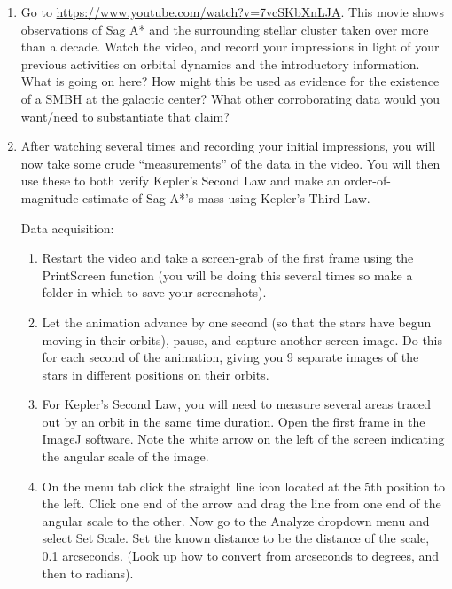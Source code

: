 \begin{enumerate}
	\item Go to \url{https://www.youtube.com/watch?v=7vcSKbXnLJA}. This movie shows observations of Sag
	A* and the surrounding stellar cluster taken over more than a decade. Watch the video, and record
	your impressions in light of your previous activities on orbital dynamics and the introductory
	information. What is going on here? How might this be used as evidence for the existence
	of a SMBH at the galactic center? What other corroborating data would you want/need to
	substantiate that claim?
	
	\item After watching several times and recording your initial impressions, you will now take some crude “measurements” of the data in the video. You will then use these to both verify Kepler’s Second Law and make an order-of-magnitude estimate of Sag A*’s mass using Kepler’s Third Law.
	
	Data acquisition:
	\begin{enumerate}
		\item Restart the video and take a screen-grab of the first frame using the PrintScreen function (you will
		be doing this several times so make a folder in which to save your screenshots).
		
		\item Let the animation advance by one second (so that the stars have begun moving in their
		orbits), pause, and capture another screen image. Do this for each second of the animation,
		giving you 9 separate images of the stars in different positions on their orbits.
		
		\item For Kepler's Second Law, you will need to measure several areas traced out by an orbit in the same time duration. Open the first frame in the ImageJ software. Note the white arrow on the left of the
		screen indicating the angular scale of the image.
		
		\item On the menu tab click the straight line icon
		located at the 5th position to the left. Click one end of the arrow and drag the line from one
		end of the angular scale to the other. Now go to the Analyze dropdown menu and select Set
		Scale. Set the known distance to be the distance of the scale, 0.1 arcseconds. (Look up how
		to convert from arcseconds to degrees, and then to radians).
		

\end{enumerate}
\end{enumerate}
